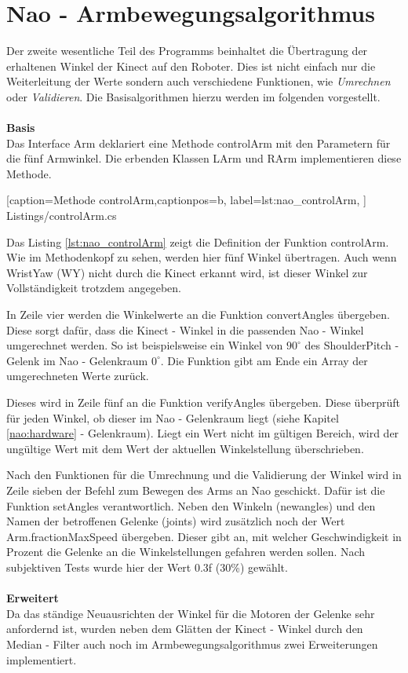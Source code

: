 \section{Nao -  Armbewegungsalgorithmus}\label{s:naoAlgo}
Der zweite wesentliche Teil des Programms beinhaltet die Übertragung der erhaltenen Winkel der Kinect auf den Roboter. Dies ist nicht einfach nur die Weiterleitung der Werte sondern auch verschiedene Funktionen, wie \textit{Umrechnen} oder \textit{Validieren}. Die Basisalgorithmen hierzu werden im folgenden vorgestellt.
\\
\\
\textbf{Basis}
\\
Das Interface \textsf{Arm} deklariert eine Methode \textsf{controlArm} mit den Parametern für die fünf Armwinkel. Die erbenden Klassen \textsf{LArm} und \textsf{RArm} implementieren diese Methode. 


    [caption={Methode \textsf{controlArm}},captionpos=b,
       label=lst:nao_controlArm,
       ]	
 {Listings/controlArm.cs}

Das Listing \ref{lst:nao_controlArm} zeigt die Definition der Funktion \textsf{controlArm}. Wie im Methodenkopf zu sehen, werden hier fünf Winkel übertragen. Auch wenn WristYaw (WY) nicht durch die Kinect erkannt wird, ist dieser Winkel zur Vollständigkeit trotzdem angegeben. 

In Zeile vier werden die Winkelwerte an die Funktion \textsf{convertAngles} übergeben. Diese sorgt dafür, dass die Kinect - Winkel in die passenden Nao - Winkel umgerechnet werden. So ist beispielsweise ein Winkel von $90^\circ$ des ShoulderPitch - Gelenk im Nao -  Gelenkraum $0^\circ$. Die Funktion gibt am Ende ein Array der umgerechneten Werte zurück.

Dieses wird in Zeile fünf an die Funktion \textsf{verifyAngles} übergeben. Diese überprüft für jeden Winkel, ob dieser im Nao - Gelenkraum liegt (siehe Kapitel \ref{nao:hardware} - Gelenkraum). Liegt ein Wert nicht im gültigen Bereich, wird der ungültige Wert mit dem Wert der aktuellen Winkelstellung überschrieben.

Nach den Funktionen für die Umrechnung und die Validierung der Winkel wird in Zeile sieben der Befehl zum Bewegen des Arms an Nao geschickt. Dafür ist die Funktion \textsf{setAngles} verantwortlich. Neben den Winkeln (\textsf{newangles}) und den Namen der betroffenen Gelenke (\textsf{joints}) wird zusätzlich noch der Wert \textsf{Arm.fractionMaxSpeed} übergeben. Dieser gibt an, mit welcher Geschwindigkeit in Prozent die Gelenke an die Winkelstellungen gefahren werden sollen. Nach subjektiven Tests wurde hier der Wert 0.3f (30\%) gewählt. 
\\
\\
\textbf{Erweitert}
\\
Da das ständige Neuausrichten der Winkel für die Motoren der Gelenke sehr anfordernd ist, wurden neben dem Glätten der Kinect - Winkel durch den Median - Filter auch noch im Armbewegungsalgorithmus zwei Erweiterungen implementiert.


